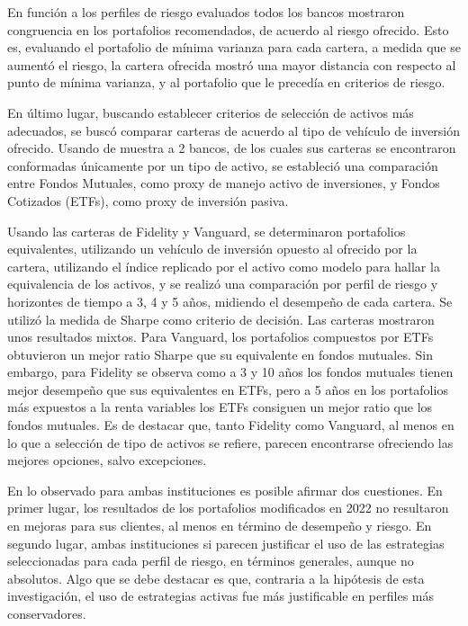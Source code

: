 \documentclass[a4paper,fleqn]{cas-sc}
\begin{document}
En función a los perfiles de riesgo evaluados todos los bancos mostraron congruencia en los portafolios recomendados, de acuerdo al riesgo ofrecido. Esto es, evaluando el portafolio de mínima varianza para cada cartera, a medida que se aumentó el riesgo, la cartera ofrecida mostró una mayor distancia con respecto al punto de mínima varianza, y al portafolio que le precedía en criterios de riesgo. 

En último lugar, buscando establecer criterios de selección de activos más adecuados, se buscó comparar carteras de acuerdo al tipo de vehículo de inversión ofrecido. Usando de muestra a 2 bancos, de los cuales sus carteras se encontraron conformadas únicamente por un tipo de activo, se estableció una comparación entre Fondos Mutuales, como proxy de manejo activo de inversiones, y Fondos Cotizados (ETFs), como proxy de inversión pasiva. 

Usando las carteras de Fidelity y Vanguard, se determinaron portafolios equivalentes, utilizando un vehículo de inversión opuesto al ofrecido por la cartera, utilizando el índice replicado por el activo como modelo para hallar la equivalencia de los activos, y se realizó una comparación por perfil de riesgo y horizontes de tiempo a 3, 4 y 5 años, midiendo el desempeño de cada cartera. Se utilizó la medida de Sharpe como criterio de decisión.  Las carteras mostraron unos resultados mixtos. Para Vanguard, los portafolios compuestos por ETFs obtuvieron un mejor ratio Sharpe que su equivalente en fondos mutuales. Sin embargo, para Fidelity se observa como a 3 y 10 años los fondos mutuales tienen mejor desempeño que sus equivalentes en ETFs, pero a 5 años en los portafolios más expuestos a la renta variables los ETFs consiguen un mejor ratio que los fondos mutuales. Es de destacar que, tanto Fidelity como Vanguard, al menos en lo que a selección de tipo de activos se refiere, parecen encontrarse ofreciendo las mejores opciones, salvo excepciones. 

En lo observado para ambas instituciones es posible afirmar dos cuestiones. En primer lugar, los resultados de los portafolios modificados en 2022 no resultaron en mejoras para sus clientes, al menos en término de desempeño y riesgo. En segundo lugar, ambas instituciones si parecen justificar el uso de las estrategias seleccionadas para cada perfil de riesgo, en términos generales, aunque no absolutos. Algo que se debe destacar es que, contraria a la hipótesis de esta investigación, el uso de estrategias activas fue más justificable en perfiles más conservadores.
\end{document}
